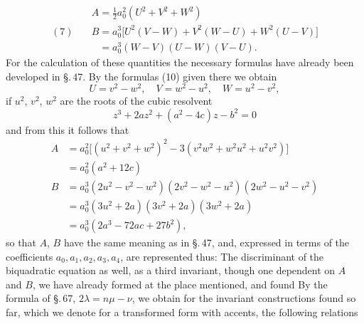\[
\begin{aligned}
& A = \tfrac{1}{2} a_0^2 (U^2 + V^2 + W^2) \\
(7)\quad & B = a_0^3 \bigl[U^2(V - W) + V^2(W - U) + W^2(U - V)\bigr] \\
& \phantom{B} = a_0^3 (W - V)(U - W)(V - U).
\end{aligned}
\]
For the calculation of these quantities the necessary formulas have
already been developed in \S.\,47. By the formulas (10) given there we obtain
\[
U = v^2 - w^2, \quad V = w^2 - u^2, \quad W = u^2 - v^2,
\]
if $u^2$, $v^2$, $w^2$ are the roots of the cubic resolvent
\[
z^3 + 2 a z^2 + (a^2 - 4 c) z - b^2 = 0
\]
and from this it follows that
\[
\begin{aligned}
A &= a_0^2 \bigl[(u^2 + v^2 + w^2)^2 - 3 (v^2 w^2 + w^2 u^2 + u^2 v^2)\bigr] \\
&= a_0^2 (a^2 + 12 c) \\
B &= a_0^3 (2 u^2 - v^2 - w^2)(2 v^2 - w^2 - u^2)(2 w^2 - u^2 - v^2) \\
&= a_0^3 (3 u^2 + 2 a)(3 v^2 + 2 a)(3 w^2 + 2 a) \\
&= a_0^3 (2 a^3 - 72 a c + 27 b^2),
\end{aligned}
\]
so that $A$, $B$ have the same meaning as in \S.\,47, and, expressed
in terms of the coefficients $a_0, a_1, a_2, a_3, a_4$, are represented thus:
The discriminant of the biquadratic equation as well, as
a third invariant, though one dependent on $A$ and $B$,
we have already formed at the place mentioned, and found
By the formula of \S.\,67, $2\lambda = n\mu - \nu$, we obtain for the
invariant constructions found so far, which we denote for a
transformed form with accents, the following relations
